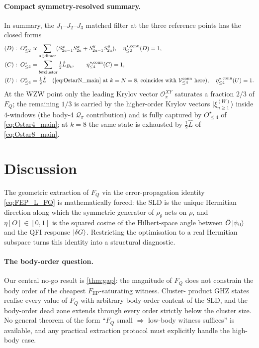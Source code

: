 \documentclass[11pt,a4paper]{article}
\newcommand{\FQ}{F_Q}
\newcommand{\FEP}{F_{\mathrm{EP}}}
\newcommand{\SLD}{\hat{L}}
\newcommand{\PsiZ}{\ket{\psi_0}}
\newcommand{\dG}{\ket{\delta G}}
\newcommand{\Vconn}[1]{\mathcal{V}^{\mathrm{conn}}_{\le #1}}
\newcommand{\etaconn}[1]{\eta^{\star,\mathrm{conn}}_{\le #1}}
\begin{document}
\paragraph{Compact symmetry-resolved summary.}
In summary, the $J_1$--$J_2$--$J_3$ matched filter at the three
reference points has the closed forms
\begin{align}
   (D):\;\;& O^\star_{\le 2}\propto\sum_{a\in\rm dimer}
        (S^x_{2a-1}S^x_{2a}+S^y_{2a-1}S^y_{2a}),\quad\etaconn{2}(D)=1,\\
   (C):\;\;& O^\star_{\le 4}=\sum_{b\in\rm cluster}\tfrac12\SLD_{B_b},
        \qquad\etaconn{4}(C)=1,\\
   (U):\;\;& O^\star_{\le 4}=\tfrac12\SLD\quad\text{(\eqref{eq:OstarN_main} at $k=N=8$,
        coincides with $\Vconn{4}$ here)},\quad\etaconn{4}(U)=1.
\end{align}
At the WZW point only the leading Krylov vector
$\mathcal O^{XY}_\pi$ saturates a fraction $2/3$ of $\FQ$; the
remaining $1/3$ is carried by the higher-order Krylov vectors
$|\xi^{(W)}_{n\ge 1}\rangle$ inside $4$-windows (the body-4
$\mathcal Q_\pi$ contribution) and is fully captured by
$O^\star_{\le 4}$ of \eqref{eq:Ostar4_main}; at $k=8$ the same
state is exhausted by $\tfrac12\SLD$ of \eqref{eq:Ostar8_main}.

\section{Discussion}
\label{sec:discussion}

The geometric extraction of $\FQ$ via the error-propagation
identity \eqref{eq:FEP_L_FQ} is mathematically forced: the SLD is
the unique Hermitian direction along which the symmetric generator
of $\rho_\theta$ acts on $\rho$, and $\eta[O]\in[0,1]$ is the
squared cosine of the Hilbert-space angle between
$\tilde O\PsiZ$ and the QFI response $\dG$.  Restricting the
optimisation to a real Hermitian subspace turns this identity into
a structural diagnostic.

\paragraph{The body-order question.}  Our central no-go result is
\cref{thm:gap}: the magnitude of $\FQ$ does not constrain the
body order of the cheapest $\FEP$-saturating witness.  Cluster-
product GHZ states realise every value of $\FQ$ with arbitrary
body-order content of the SLD, and the body-order dead zone
extends through every order strictly below the cluster size.  No
general theorem of the form ``$\FQ$ small $\Rightarrow$ low-body
witness suffices'' is available, and any practical extraction
protocol must explicitly handle the high-body case.
\end{document}
